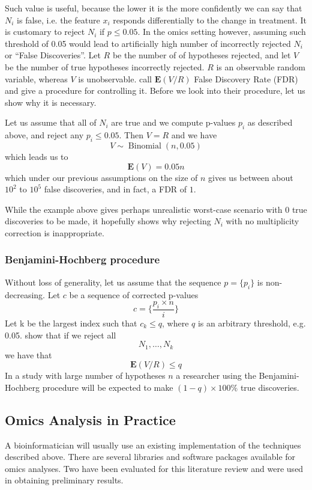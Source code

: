 Such value is useful, because the lower it is the more confidently we can say that $N_{i}$ is false, i.e. the feature $x_{i}$ responds differentially to the change in treatment. It is customary to reject $N_{i}$ if $p \leq 0.05$. In the omics setting however, assuming such threshold of 0.05 would lead to artificially high number of incorrectly rejected $N_{i}$ or ``False Discoveries''. Let $R$ be the number of of hypotheses rejected, and let $V$ be the number of true hypotheses incorrectly rejected. $R$ is an observable random variable, whereas $V$ is unobservable. \textcite{Benjamini1995} call $\mathbf{E}(V/R)$ False Discovery Rate (FDR) and give a procedure for controlling it. Before we look into their procedure, let us show why it is necessary.

Let us assume that all of $N_{i}$ are true and we compute p-values $p_{i}$ as described above, and reject any $p_{i} \leq 0.05$. Then $V = R$ and we have $$V \sim \operatorname{Binomial}(n, 0.05)$$ which leads us to $$\mathbf{E}(V)=0.05n$$which under our previous assumptions on the size of $n$ gives us between about $10^{2}$ to $10^{5}$ false discoveries, and in fact, a FDR of $1$.

While the example above gives perhaps unrealistic worst-case scenario with $0$ true discoveries to be made, it hopefully shows why rejecting $N_{i}$ with no multiplicity correction is inappropriate.
\subsubsection{Benjamini-Hochberg procedure}
Without loss of generality, let us assume that the sequence $p=\{p_{i}\}$ is non-decreasing. Let $c$ be a sequence of corrected p-values $$c=\{\frac{p_{i} \times n}{i}\}$$Let k be the largest index such that $c_{k} \leq q$, where $q$ is an arbitrary threshold, e.g. 0.05. \textcite{Benjamini1995} show that if we reject all $$N_{1}, \ldots, N_{k}$$
we have that $$\mathbf{E}(V/R) \leq q$$In a study with large number of hypotheses $n$ a researcher using the Benjamini-Hochberg procedure will be expected to make $(1-q)\times 100\%$ true discoveries.

\subsection{Omics Analysis in Practice}

A bioinformatician will usually use an existing implementation of the techniques described above. There are several libraries and software packages available for omics analyses. Two have been evaluated for this literature review and were used in obtaining preliminary results.

